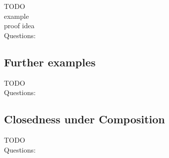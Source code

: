 \documentclass[a4]{scrartcl}
\begin{document}
\color{red} TODO \\
example \\
proof idea \\
\color{black}
\color{violet} Questions:
\color{black}









\subsection*{Further examples}

\color{red} TODO \\
\color{black}
\color{violet} Questions:
\color{black}








\subsection*{Closedness under Composition}


\color{red} TODO \\
\color{black}
\color{violet} Questions:
\color{black}





\newpage

\printbibliography
\end{document}
